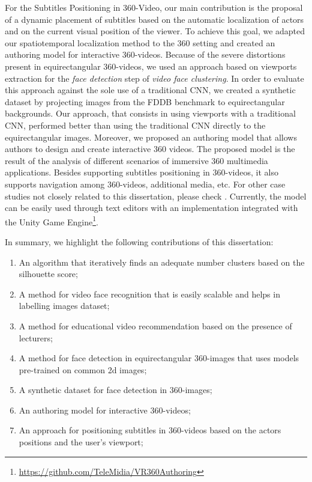 For the Subtitles Positioning in 360-Video, our main contribution is the proposal of a dynamic placement of subtitles based on the automatic localization of actors and on the current visual position of the viewer. To achieve this goal, we adapted our spatiotemporal localization method to the 360 setting and created an authoring model for interactive 360-videos. Because of the severe distortions present in equirectangular 360-videos, we used an approach based on viewports extraction for the \emph{face detection} step of \emph{video face clustering}. In order to evaluate this approach against the sole use of a traditional CNN, we created a synthetic dataset by projecting images from the FDDB benchmark to equirectangular backgrounds. Our approach, that consists in using viewports with a traditional CNN, performed better than using the traditional CNN directly to the equirectangular images. Moreover, we proposed an authoring model that allows authors to design and create
interactive 360 videos. The proposed model is the result of the analysis of different scenarios of immersive 360 multimedia applications. Besides supporting subtitles positioning in 360-videos, it also supports navigation among 360-videos, additional media, etc. For other case studies not closely related to this dissertation, please check \cite{mendes2020authoring}. Currently, the model can be easily used through text editors with an implementation integrated with the Unity Game Engine\footnote{\url{https://github.com/TeleMidia/VR360Authoring}}.

In summary, we highlight the following contributions of this dissertation:
\begin{enumerate}
    \item An algorithm that iteratively finds an adequate number clusters based on the silhouette score;
    \item A method for video face recognition that is easily scalable and helps in labelling images dataset;
    \item A method for educational video recommendation based on the presence of lecturers;
    \item A method for face detection in equirectangular 360-images that uses models pre-trained on common 2d images;
    \item A synthetic dataset for face detection in 360-images;
    \item An authoring model for interactive 360-videos;
    \item An approach for positioning subtitles in 360-videos based on the actors positions and the user's viewport;
\end{enumerate}

